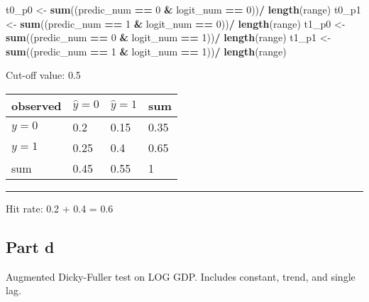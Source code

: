 \documentclass[]{article}
\newenvironment{Shaded}{\begin{snugshade}}{\end{snugshade}}
\newcommand{\DecValTok}[1]{\textcolor[rgb]{0.00,0.00,0.81}{#1}}
\newcommand{\KeywordTok}[1]{\textcolor[rgb]{0.13,0.29,0.53}{\textbf{#1}}}
\newcommand{\NormalTok}[1]{#1}
\newcommand{\OperatorTok}[1]{\textcolor[rgb]{0.81,0.36,0.00}{\textbf{#1}}}
\newcommand{\StringTok}[1]{\textcolor[rgb]{0.31,0.60,0.02}{#1}}
\begin{document}
\begin{Shaded}
\begin{Highlighting}[]
\NormalTok{t0_p0 <-}\StringTok{ }\KeywordTok{sum}\NormalTok{((predic_num }\OperatorTok{==}\StringTok{ }\DecValTok{0} \OperatorTok{&}\StringTok{ }\NormalTok{logit_num }\OperatorTok{==}\StringTok{ }\DecValTok{0}\NormalTok{))}\OperatorTok{/}\StringTok{ }\KeywordTok{length}\NormalTok{(range)}
\NormalTok{t0_p1 <-}\StringTok{ }\KeywordTok{sum}\NormalTok{((predic_num }\OperatorTok{==}\StringTok{ }\DecValTok{1} \OperatorTok{&}\StringTok{ }\NormalTok{logit_num }\OperatorTok{==}\StringTok{ }\DecValTok{0}\NormalTok{))}\OperatorTok{/}\StringTok{ }\KeywordTok{length}\NormalTok{(range)}
\NormalTok{t1_p0 <-}\StringTok{ }\KeywordTok{sum}\NormalTok{((predic_num }\OperatorTok{==}\StringTok{ }\DecValTok{0} \OperatorTok{&}\StringTok{ }\NormalTok{logit_num }\OperatorTok{==}\StringTok{ }\DecValTok{1}\NormalTok{))}\OperatorTok{/}\StringTok{ }\KeywordTok{length}\NormalTok{(range)}
\NormalTok{t1_p1 <-}\StringTok{ }\KeywordTok{sum}\NormalTok{((predic_num }\OperatorTok{==}\StringTok{ }\DecValTok{1} \OperatorTok{&}\StringTok{ }\NormalTok{logit_num }\OperatorTok{==}\StringTok{ }\DecValTok{1}\NormalTok{))}\OperatorTok{/}\StringTok{ }\KeywordTok{length}\NormalTok{(range)}
\end{Highlighting}
\end{Shaded}

Cut-off value: 0.5

\begin{longtable}[]{@{}llll@{}}
\toprule
observed & \(\hat{y} = 0\) & \(\hat{y} = 1\) & sum\tabularnewline
\midrule
\endhead
\(y = 0\) & 0.2 & 0.15 & 0.35\tabularnewline
\(y = 1\) & 0.25 & 0.4 & 0.65\tabularnewline
sum & 0.45 & 0.55 & 1\tabularnewline
\bottomrule
\end{longtable}

\begin{center}\rule{0.5\linewidth}{\linethickness}\end{center}

Hit rate: 0.2 + 0.4 = 0.6

\hypertarget{part-d}{%
\subsection{Part d}\label{part-d}}

Augmented Dicky-Fuller test on LOG GDP. Includes constant, trend, and
single lag.
\end{document}
